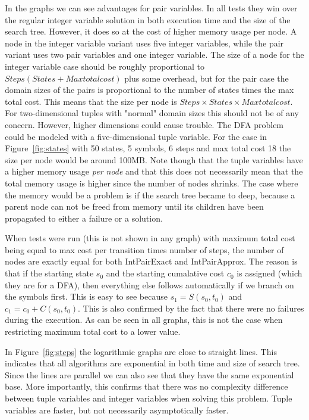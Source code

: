 \documentclass[a4paper,11pt]{article}
\begin{document}
In the graphs we can see advantages for pair variables. In all tests they win over the regular integer variable solution in both execution time and the size of the search tree. However, it does so at the cost of higher memory usage per node. A node in the integer variable variant uses five integer variables, while the pair variant uses two pair variables and one integer variable. The size of a node for the integer variable case should be roughly proportional to $Steps(States + Maxtotalcost)$ plus some overhead, but for the pair case the domain sizes of the pairs is proportional to the number of states times the max total cost. This means that the size per node is $Steps\times States\times Maxtotalcost$. For two-dimensional tuples with "normal" domain sizes this should not be of any concern. However, higher dimensions could cause trouble. The DFA problem could be modeled with a five-dimensional tuple variable. For the case in Figure~\ref{fig:states} with 50 states, 5 symbols, 6 steps and max total cost 18 the size per node would be around 100MB. Note though that the tuple variables have a higher memory usage \textit{per node} and that this does not necessarily mean that the total memory usage is higher since the number of nodes shrinks. The case where the memory would be a problem is if the search tree became to deep, because a parent node can not be freed from memory until its children have been propagated to either a failure or a solution.

When tests were run (this is not shown in any graph) with maximum total cost being equal to max cost per transition times number of steps, the number of nodes are exactly equal for both IntPairExact and IntPairApprox. The reason is that if the starting state $s_0$ and the starting cumalative cost $c_0$ is assigned (which they are for a DFA), then everything else follows automatically if we branch on the symbols first. This is easy to see because $s_1=S(s_0, t_0)$ and $c_1=c_0+C(s_0, t_0)$. This is also confirmed by the fact that there were no failures during the execution. As can be seen in all graphs, this is not the case when restricting maximum total cost to a lower value.

In Figure~\ref{fig:steps} the logarithmic graphs are close to straight lines. This indicates that all algorithms are exponential in both time and size of search tree. Since the lines are parallel we can also see that they have the same exponential base. More importantly, this confirms that there was no complexity difference between tuple variables and integer variables when solving this problem. Tuple variables are faster, but not necessarily asymptotically faster. 
\end{document}
